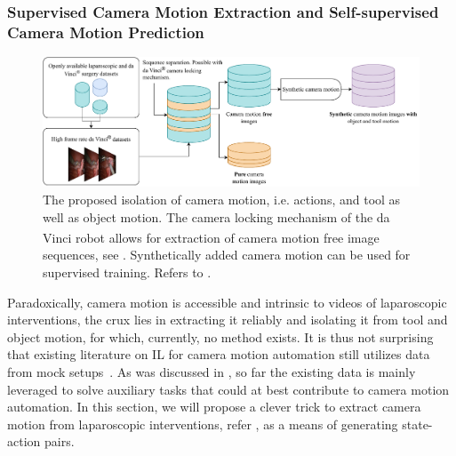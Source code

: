 \subsubsection{Supervised Camera Motion Extraction and Self-supervised Camera Motion Prediction}
\label{in:sec:supervised_self_supervised}
\begin{figure}[tb]
    \centering
    \includegraphics[width=\textwidth]{introduction/fig/camera_motion.pdf}
    \caption{The proposed isolation of camera motion, i.e. actions, and tool as well as object motion. The camera locking mechanism of the da Vinci\textsuperscript{\textregistered} robot allows for extraction of camera motion free image sequences, see . Synthetically added camera motion can be used for supervised training. Refers to .}
    \label{in:fig:camera_motion}
\end{figure}
Paradoxically, camera motion is accessible and intrinsic to videos of laparoscopic interventions, the crux lies in extracting it reliably and isolating it from tool and object motion, for which, currently, no method exists. It is thus not surprising that existing literature on IL for camera motion automation still utilizes data from mock setups~\cite{ji2018learning,wagner2021learning}. As was discussed in , so far the existing data is mainly leveraged to solve auxiliary tasks that could at best contribute to camera motion automation. In this section, we will propose a clever trick to extract camera motion from laparoscopic interventions, refer , as a means of generating state-action pairs.


